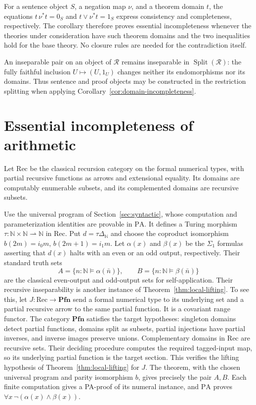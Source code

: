 \documentclass[11pt]{article}
\newcommand{\N}{\mathbb N}
\newcommand{\PA}{\mathrm{PA}}
\newcommand{\Pfn}{\mathbf{Pfn}}
\begin{document}
For a sentence object $S$, a negation map $\nu$, and a theorem domain
$t$, the equations $t\,\nu^*t=0_S$ and $t\vee\nu^*t=1_S$
express consistency and completeness, respectively.
The corollary therefore proves essential
incompleteness whenever the theories under consideration have such
theorem domains and the two inequalities hold for the base theory.
No closure rules are needed for the contradiction itself.

An inseparable pair on an object of $\mathscr R$ remains inseparable
in $\operatorname{Split}(\mathscr R)$: the fully faithful inclusion
$U\mapsto(U,1_U)$ changes neither its endomorphisms nor its domains.
Thus sentence and proof objects may be constructed in the restriction
splitting when applying Corollary~\ref{cor:domain-incompleteness}.

\section{Essential incompleteness of arithmetic}\label{sec:arithmetic}

Let $\mathrm{Rec}$ be the classical recursion category on the formal
numerical types, with partial recursive functions as arrows and extensional
equality. Its domains are computably enumerable subsets, and its
complemented domains are recursive subsets.

Use the universal program of Section~\ref{sec:syntactic}, whose
computation and parameterization identities are provable in $\PA$.
It defines a Turing morphism
$\tau:\N\times\N\rightharpoonup\N$ in $\mathrm{Rec}$.
Put $d=\tau\Delta_{\N}$ and choose the coproduct isomorphism
$b(2m)=i_0m$, $b(2m+1)=i_1m$.
Let $\alpha(x)$ and $\beta(x)$ be the $\Sigma_1$ formulas asserting
that $d(x)$ halts with an even or an odd output, respectively.
Their standard truth sets
\[
 A=\{n:\N\models\alpha(\bar n)\},\qquad
 B=\{n:\N\models\beta(\bar n)\}
\]
are the classical even-output and odd-output sets for self-application.
Their recursive inseparability is another instance of
Theorem~\ref{thm:local-lifting}. To see this, let
$J:\mathrm{Rec}\to\Pfn$ send a formal numerical type to its underlying
set and a partial recursive arrow to the same partial function.
It is a covariant range functor. The category $\Pfn$ satisfies
the target hypotheses: singleton domains detect partial functions,
domains split as subsets, partial injections have partial inverses,
and inverse images preserve unions. Complementary domains in
$\mathrm{Rec}$ are recursive sets. Their deciding procedure computes
the required tagged-input map, so its underlying partial function is
the target section. This verifies the lifting hypothesis of
Theorem~\ref{thm:local-lifting} for $J$.
The theorem, with the chosen universal program and parity
isomorphism $b$, gives precisely the pair $A,B$.
Each finite computation gives a PA-proof of its numeral instance, and $\PA$ proves
$\forall x\,\neg(\alpha(x)\land\beta(x))$.
\end{document}
